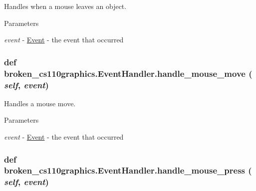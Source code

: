 Handles when a mouse leaves an object. 
\begin{DoxyParams}{Parameters}
\item[{\em event}]-\/ \hyperlink{classbroken__cs110graphics_1_1Event}{Event} -\/ the event that occurred \end{DoxyParams}
\hypertarget{classbroken__cs110graphics_1_1EventHandler_a4277deafa3c6eb088674f6ae561c0ca7}{
\subsubsection[{handle\_\-mouse\_\-move}]{\setlength{\rightskip}{0pt plus 5cm}def broken\_\-cs110graphics.EventHandler.handle\_\-mouse\_\-move ( {\em self}, \/   {\em event})}}
\label{classbroken__cs110graphics_1_1EventHandler_a4277deafa3c6eb088674f6ae561c0ca7}


Handles a mouse move. 
\begin{DoxyParams}{Parameters}
\item[{\em event}]-\/ \hyperlink{classbroken__cs110graphics_1_1Event}{Event} -\/ the event that occurred \end{DoxyParams}
\hypertarget{classbroken__cs110graphics_1_1EventHandler_aa1d6a9e7eac44b038c67dbcb5baccec0}{
\subsubsection[{handle\_\-mouse\_\-press}]{\setlength{\rightskip}{0pt plus 5cm}def broken\_\-cs110graphics.EventHandler.handle\_\-mouse\_\-press ( {\em self}, \/   {\em event})}}
\label{classbroken__cs110graphics_1_1EventHandler_aa1d6a9e7eac44b038c67dbcb5baccec0}


